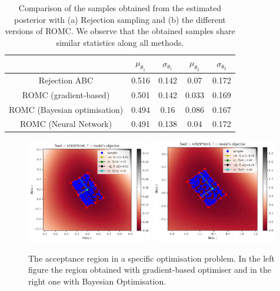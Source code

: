 \begin{table}
\begin{center}
\begin{tabular}{ c|c|c|c|c }
\hline
& \(\mu_{\theta_1}\) & \(\sigma_{\theta_1}\) & \(\mu_{\theta_2}\) & \(\sigma_{\theta_2}\) \\
\hline \hline
Rejection ABC & 0.516 & 0.142 & 0.07 & 0.172 \\
\hline
ROMC (gradient-based) & 0.501 & 0.142 & 0.033 & 0.169 \\
\hline
ROMC (Bayesian optimisation) & 0.494 & 0.16 & 0.086 & 0.167 \\
\hline
ROMC (Neural Network) & 0.491 & 0.138 & 0.04 & 0.172 \\
\hline
\end{tabular}
\end{center}
\caption{Comparison of the samples obtained from the estimated
  posterior with (a) Rejection sampling and (b) the different versions
  of ROMC. We observe that the obtained samples share similar
  statistics along all methods. \label{tab:ma2}}
\end{table}

\begin{figure}[ht]
    \begin{center}
        \includegraphics[width=0.49\textwidth]{./latex_files/images/chapter4/ma2_region_1.png}
        \includegraphics[width=0.49\textwidth]{./latex_files/images/chapter4/ma2_region_1_bo.png}
    \end{center}
  \caption[The acceptance region of a specific deterministic simulator.]{The acceptance region in a specific optimisation problem. In the left figure the region obtained with gradient-based optimiser and in the right one with Bayesian Optimisation.}
  \label{fig:ma2_5}
\end{figure}



